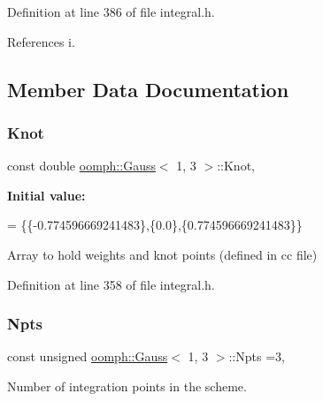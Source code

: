 Definition at line 386 of file integral.\+h.



References i.



\subsection{Member Data Documentation}
\mbox{\label{classoomph_1_1Gauss_3_011_00_013_01_4_a73a1e6a0f0cb9b93070d255a90db54e7}} 
\subsubsection{\texorpdfstring{Knot}{Knot}}
{\footnotesize\ttfamily const double \hyperlink{classoomph_1_1Gauss}{oomph\+::\+Gauss}$<$ 1, 3 $>$\+::Knot\hspace{0.3cm}{\ttfamily [static]}, {\ttfamily [private]}}

{\bfseries Initial value\+:}
\begin{DoxyCode}
= 
\{\{-0.774596669241483\},\{0.0\},\{0.774596669241483\}\}
\end{DoxyCode}


Array to hold weights and knot points (defined in cc file) 



Definition at line 358 of file integral.\+h.

\mbox{\label{classoomph_1_1Gauss_3_011_00_013_01_4_a303e40987dc6ba6449d7e43949055402}} 
\subsubsection{\texorpdfstring{Npts}{Npts}}
{\footnotesize\ttfamily const unsigned \hyperlink{classoomph_1_1Gauss}{oomph\+::\+Gauss}$<$ 1, 3 $>$\+::Npts =3\hspace{0.3cm}{\ttfamily [static]}, {\ttfamily [private]}}



Number of integration points in the scheme. 



